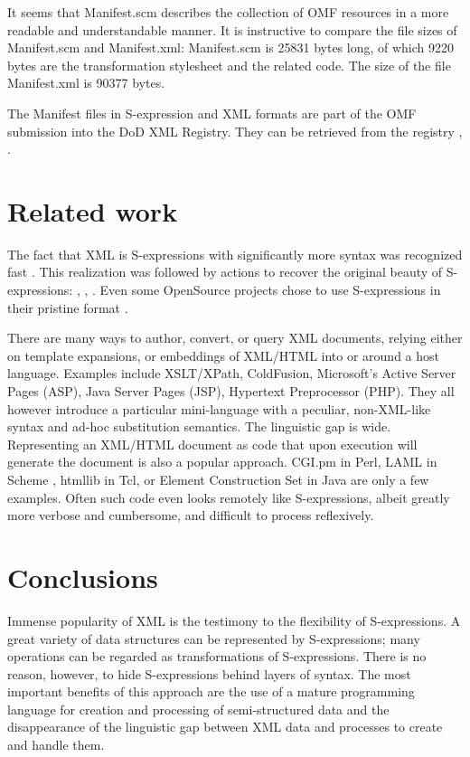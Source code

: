 \documentclass[10pt]{llncs}
\begin{document}
It seems that Manifest.scm describes the collection of OMF
resources in a more readable and understandable manner. It is instructive
to compare the file sizes of Manifest.scm and Manifest.xml:
Manifest.scm is 25831 bytes long, of which 9220 bytes are the
transformation stylesheet and the related code. The size of the file
Manifest.xml is 90377 bytes.

The Manifest files in S-expression and XML formats are part of
the OMF submission into the DoD XML Registry. They can be retrieved
from the registry \cite{Manifest-XML}, \cite{Manifest-SCM}.

\section{Related work}
The fact that XML is S-expressions with significantly more syntax
was recognized fast \cite{Wadler700}. This realization was
followed by actions to recover the original beauty of S-expressions: 
\cite{XT3D}, \cite{SXML-short-paper}, \cite{LAML}. Even
some OpenSource projects chose to use S-expressions in their pristine
format \cite{Slashdot}.

There are many ways to author, convert, or query XML documents,
relying either on template expansions, or embeddings of XML/HTML into
or around a host language. Examples include XSLT/XPath, ColdFusion,
Microsoft's Active Server Pages (ASP), Java Server Pages (JSP),
Hypertext Preprocessor (PHP). They all however introduce a particular
mini-language with a peculiar, non-XML-like syntax and ad-hoc
substitution semantics. The linguistic gap is wide. Representing an
XML/HTML document as code that upon execution will generate the
document is also a popular approach. CGI.pm in Perl, LAML in Scheme \cite{LAML}, htmllib in Tcl, or Element Construction Set in Java
are only a few examples. Often such code even looks remotely like
S-expressions, albeit greatly more verbose and cumbersome, and
difficult to process reflexively.

\section{Conclusions}
Immense popularity of XML is the testimony to the flexibility of
S-expressions. A great variety of data structures can be represented by
S-expressions; many operations can be regarded as transformations of
S-expressions. There is no reason, however, to hide S-expressions behind
layers of syntax. The most important benefits of this approach are the
use of a mature programming language for creation and processing
of semi-structured data and the disappearance of the linguistic gap
between XML data and processes to create and handle them.
\end{document}
